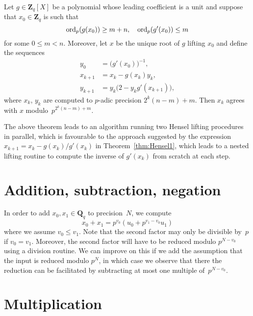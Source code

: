\begin{thm} \label{thm:Hensel2}
Let $g \in \mathbf{Z}_q[X]$ be a polynomial whose leading coefficient 
is a unit and suppose that $x_0 \in \mathbf{Z}_q$ is such that 
\begin{equation*}
\operatorname{ord}_p(g(x_0)) \geq m + n, \quad \operatorname{ord}_p(g'(x_0)) \leq m
\end{equation*}
for some $0 \leq m < n$.  Moreover, let $x$ be the unique root of $g$ 
lifting $x_0$ and define the sequences
\begin{align*}
y_0 & = \bigl( g'(x_0) \bigr)^{-1}, \\
x_{k+1} & = x_k - g(x_k) y_k, \\
y_{k+1} & = y_k \bigl( 2 - y_k g'(x_{k+1}) \bigr),
\end{align*}
where $x_k$, $y_k$ are computed to $p$-adic precision $2^k (n-m) + m$.
Then $x_k$ agrees with $x$ modulo~$p^{2^k (n - m) + m}$.
\end{thm}

\begin{rem}
The above theorem leads to an algorithm running two Hensel lifting 
procedures in parallel, which is favourable to the approach suggested 
by the expression $x_{k+1} = x_k - g(x_k) / g'(x_k)$ in 
Theorem~\ref{thm:Hensel1}, which leads to a nested lifting routine to 
compute the inverse of $g'(x_k)$ from scratch at each step.
\end{rem}

\section{Addition, subtraction, negation}

In order to add $x_0, x_1 \in \mathbf{Q}_q$ to precision~$N$, 
we compute 
\begin{equation}
x_0 + x_1 = p^{v_0} (u_0 + p^{v_1 - v_0} u_1)
\end{equation}
where we assume $v_0 \leq v_1$.  Note that the second factor may 
only be divisible by~$p$ if $v_0 = v_1$.  Moreover, the second factor 
will have to be reduced modulo $p^{N - v_0}$ using a division 
routine.  We can improve on this if we add the assumption that 
the input is reduced modulo $p^N$, in which case we observe that 
there the reduction can be facilitated by subtracting at most 
one multiple of~$p^{N-v_0}$.

\section{Multiplication}

